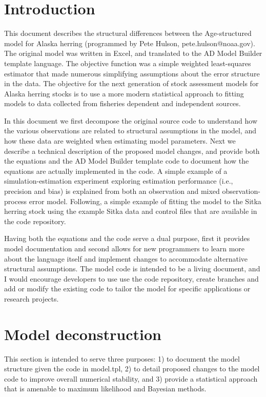 \documentclass[12pt,letterpaper]{article}
\begin{document}
  \tableofcontents

  \section{Introduction} %
  \label{sec:introduction}

  This document describes the structural differences between the Age-structured model for Alaska herring (programmed by Pete Hulson, pete.hulson@noaa.gov). The original model was written in Excel, and translated to the AD Model Builder template language.  The objective function was a simple weighted least-squares estimator that made numerous simplifying assumptions about the error structure in the data.  The objective for the next generation of stock assessment models for Alaska herring stocks is to use a  more modern statistical approach to fitting models to data collected from fisheries dependent and independent sources.  

  In this document we first decompose the original source code to understand how the various observations are related to structural assumptions in the model, and how these data are weighted when estimating model parameters.  Next we describe a technical description of the proposed model changes, and provide both the equations and the AD Model Builder template code to document how the equations are actually implemented in the code.  A simple example of a simulation-estimation experiment exploring estimation performance (i.e., precision and bias) is explained from both  an observation and mixed observation-process error model. Following, a simple example of fitting the model to the Sitka herring stock using the example Sitka data and control files that are available in the code repository.  

  Having both the equations and the code serve a dual purpose, first it provides model documentation and second allows for new programmers to learn more about the language itself and implement changes to accommodate alternative structural assumptions. The model code is intended to be a living document, and I would encourage developers to use use the code repository, create branches and add or modify the existing code to tailor the model for specific  applications or research projects.
  

  \section{Model deconstruction} %
  \label{sec:model_deconstruction}
  This section is intended to serve three purposes: 1) to document the model structure given the code in model.tpl,  2) to detail proposed changes to the model code to improve overall numerical stability, and 3) provide a statistical approach that is amenable to maximum likelihood and Bayesian methods.
\end{document}
